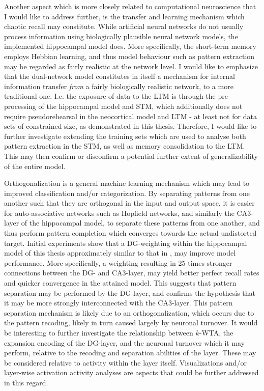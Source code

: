 Another aspect which is more closely related to computational neuroscience that I would like to address further, is the transfer and learning mechanism which chaotic recall may constitute.
While artificial neural networks do not usually process information using biologically plausible neural network models, the implemented hippocampal model does. More specifically, the short-term memory employs Hebbian learning, and thus model behaviour such as pattern extraction may be regarded as fairly realistic at the network level.
I would like to emphasize that the dual-network model constitutes in itself a mechanism for internal information transfer \textit{from} a fairly biologically realistic network, to a more traditional one. I.e. the exposure of data to the LTM is through the pre-processing of the hippocampal model and STM, which additionally does not require pseudorehearsal in the neocortical model and LTM - at least not for data sets of constrained size, as demonstrated in this thesis. Therefore, I would like to further investigate extending the training sets which are used to analyse both pattern extraction in the STM, as well as memory consolidation to the LTM. This may then confirm or disconfirm a potential further extent of generalizability of the entire model.

Orthogonalization is a general machine learning mechanism which may lead to improved classification and/or categorization. By separating patterns from one another such that they are orthogonal in the input and output space, it is easier for auto-associative networks such as Hopfield networks, and similarly the CA3-layer of the hippocampal model, to separate these patterns from one another, and thus perform pattern completion which converges towards the actual undistorted target.
Initial experiments show that a DG-weighting within the hippocampal model of this thesis approximately similar to that in \citep{Wakagi2008}, may improve model performance. More specifically, a weighting resulting in 25 times stronger connections between the DG- and CA3-layer, may yield better perfect recall rates and quicker convergence in the attained model. This suggests that pattern separation may be performed by the DG-layer, and confirms the hypothesis that it may be more strongly interconnected with the CA3-layer. This pattern separation mechanism is likely due to an orthogonalization, which occurs due to the pattern recoding, likely in turn caused largely by neuronal turnover. It would be interesting to further investigate the relationship between $k$-WTA, the expansion encoding of the DG-layer, and the neuronal turnover which it may perform, relative to the recoding and separation abilities of the layer. These may be considered relative to activity within the layer itself. Visualizations and/or layer-wise activation activity analyses are aspects that could be further addressed in this regard.

